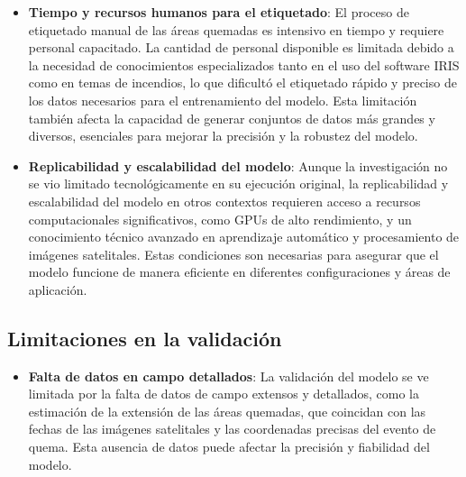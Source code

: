 \begin{itemize}
    \item \textbf{Tiempo y recursos humanos para el etiquetado}: El proceso de etiquetado manual de las áreas quemadas es intensivo en tiempo y requiere personal capacitado. 
    La cantidad de personal disponible es limitada debido a la necesidad de conocimientos especializados tanto en el uso del software IRIS como en temas de incendios, lo que dificultó 
    el etiquetado rápido y preciso de los datos necesarios para el entrenamiento del modelo. Esta limitación también afecta la capacidad de generar conjuntos de datos más grandes y diversos, 
    esenciales para mejorar la precisión y la robustez del modelo.

    \item \textbf{Replicabilidad y escalabilidad del modelo}: Aunque la investigación no se vio limitado tecnológicamente en su ejecución original, la replicabilidad y escalabilidad del modelo en otros 
    contextos requieren acceso a recursos computacionales significativos, como GPUs de alto rendimiento, y un conocimiento técnico avanzado en aprendizaje automático y procesamiento de imágenes 
    satelitales. Estas condiciones son necesarias para asegurar que el modelo funcione de manera eficiente en diferentes configuraciones y áreas de aplicación.
\end{itemize}

\subsection{Limitaciones en la validación}

\begin{itemize}
    \item \textbf{Falta de datos en campo detallados}:  La validación del modelo se ve limitada por la falta de datos de campo extensos y detallados, como la estimación de la extensión de las áreas quemadas, 
    que coincidan con las fechas de las imágenes satelitales y las coordenadas precisas del evento de quema. Esta ausencia de datos puede afectar la precisión y fiabilidad del modelo.   
\end{itemize}
